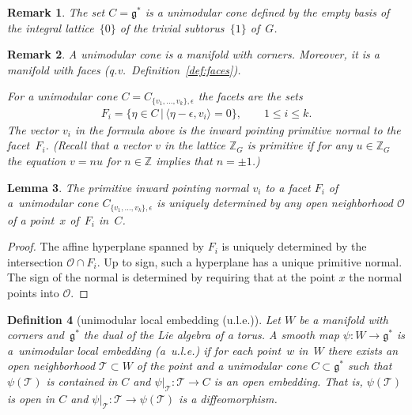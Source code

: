 \documentclass[10pt,a4paper]{amsart}
\numberwithin{equation}{section}
\newtheorem{Lemma}{Lemma}[section]
\newtheorem{Definition}[Lemma]{Definition}
\newtheorem{Remark}[Lemma]{Remark}
\begin{document}
\begin{Remark}
The set $C={\mathfrak g}^*$ is a unimodular cone def\/ined by the empty basis
of the integral lattice~$\{ 0 \}$ of the trivial subtorus~$\{1\}$ of~$G$.
\end{Remark}


\begin{Remark}
A unimodular cone is a manifold with corners.
Moreover, it is a manifold with faces (q.v.\ Def\/inition~\ref{def:faces}).

For a unimodular cone $C= C_{\{v_1,\ldots,v_k\}, \epsilon}$ the
facets are the sets
\begin{gather*}
F_i= \{ \eta \in C\,|\, \langle \eta -\epsilon , v_i\rangle =0\},
        \qquad 1\leq i\leq k.
\end{gather*}
The vector $v_i$ in the formula above is the inward
pointing primitive normal to the facet~$F_i$. (Recall that a
vector $v$ in the lattice ${\mathbb Z}_G$ is {\em primitive}
if for any $u\in {\mathbb Z}_G$ the equation $v=nu$ for $n\in {\mathbb Z}$
implies that $n= \pm 1$.)
\end{Remark}

\begin{Lemma}\label{lem:prim-norm}
  The primitive inward pointing normal $v_i$ to a facet $F_i$ of a~unimodular cone $C_{\{v_1,\ldots,v_k\}, \epsilon}$ is uniquely
  determined by any open neighborhood ${\mathcal O}$ of a point~$x$ of~$F_i$
  in~$C$.
\end{Lemma}

\begin{proof}
The af\/f\/ine hyperplane spanned by $F_i$ is uniquely
determined by the intersection \mbox{${\mathcal O}\cap F_i$}.  Up to sign, such a
hyperplane has a unique primitive normal.  The sign of the normal is
determined by requiring that at the point $x$ the normal points into
${\mathcal O}$.
\end{proof}

\begin{Definition}[unimodular local embedding (u.l.e.)]
\label{def:unimodular emb}
  Let $W$ be a manifold with corners and~${\mathfrak g}^*$ the dual of
  the Lie algebra of a torus.  A smooth map $\psi \colon W \to {\mathfrak g}^*$
  is a~\emph{unimodular local embedding} (a~{\em u.l.e.}) if for each
  point~$w$ in~$W$ there exists an open neighborhood ${\mathcal T} \subset W$ of
  the point and a unimodular cone $C \subset {\mathfrak g}^*$ such that
  $\psi({\mathcal T})$ is contained in $C$ and $\psi|_{{\mathcal T}} \colon {\mathcal T}
  \to C$ is an {\em open embedding}. That is, $\psi({\mathcal T})$ is open in $C$
  and $\psi|_{{\mathcal T}}\colon  {\mathcal T}\to \psi({\mathcal T})$ is a dif\/feomorphism.
\end{Definition}
\end{document}
